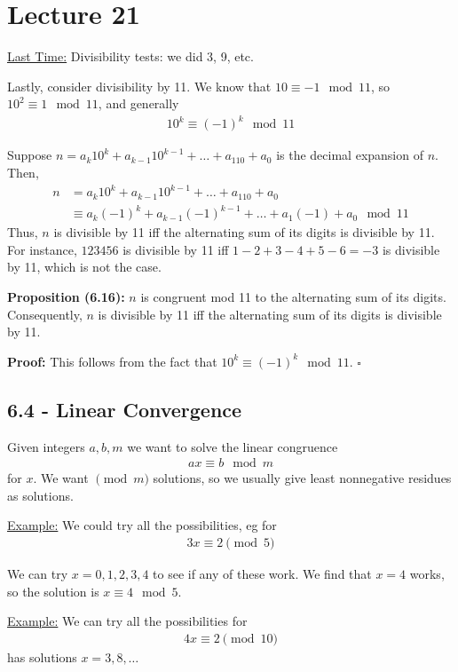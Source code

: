 \documentclass{article}
\newcommand*{\qed}{\hfill$\square$}%
\begin{document}
\section{Lecture 21}

\underline{Last Time:} Divisibility tests: we did 3, 9, etc. 

Lastly, consider divisibility by 11. We know that $10\equiv -1\mod 11$, so $10^2\equiv 1\mod 11$, and generally \begin{align*}
    10^k\equiv (-1)^k\mod 11
\end{align*}

Suppose $n=a_k10^k+a_{k-1}10^{k-1}+\dots + a_110+a_0$ is the decimal expansion of $n$. Then, \begin{align*}
    n&=a_k10^k+a_{k-1}10^{k-1}+\dots + a_110+a_0\\
    &\equiv a_k(-1)^k+a_{k-1}(-1)^{k-1}+\dots + a_1(-1)+a_0\mod 11
\end{align*}Thus, $n$ is divisible by 11 iff the alternating sum of its digits is divisible by 11. For instance, $123456$ is divisible by 11 iff $1-2+3-4+5-6=-3$ is divisible by 11, which is not the case.

\textbf{Proposition (6.16):} $n$ is congruent mod 11 to the alternating sum of its digits. Consequently, $n$ is divisible by 11 iff the alternating sum of its digits is divisible by 11.

\textbf{Proof:} This follows from the fact that $10^k\equiv (-1)^k\mod 11$. \qed

\subsection{6.4 - Linear Convergence}

Given integers $a,b,m$ we want to solve the linear congruence \begin{align*}
    ax\equiv b\mod m
\end{align*} for $x$. We want $\pmod{m}$ solutions, so we usually give least nonnegative residues as solutions.

\underline{Example:} We could try all the possibilities, eg for \begin{align*}
    3x\equiv 2\pmod 5
\end{align*}

We can try $x=0,1,2,3,4$ to see if any of these work. We find that $x=4$ works, so the solution is $x\equiv 4\mod 5$.

\underline{Example:} We can try all the possibilities for \begin{align*}
    4x\equiv 2\pmod 10
\end{align*}has solutions $x=3,8,\dots$
\end{document}
